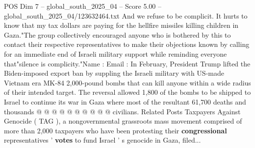 \begin{textsample}{POS Dim 7 – global\_south\_2025\_04 – Score 5.00 – global\_south\_2025\_04/123632464.txt}
And we refuse to be complicit.
It hurts to know that my tax dollars are paying for the hellfire missiles killing children in Gaza."The group collectively encouraged anyone who is bothered by this to contact their respective representatives to make their objections known by calling for an immediate end of Israeli military support while reminding everyone that"silence is complicity."Name : Email : In February, President Trump lifted the Biden-imposed export ban by suppling the Israeli military with US-made Vietnam era MK-84 2,000-pound bombs that can kill anyone within a wide radius of their intended target.
The reversal allowed 1,800 of the bombs to be shipped to Israel to continue its war in Gaza where most of the resultant 61,700 deaths and thousands @ @ @ @ @ @ @ @ @ @ civilians.
Related Posts Taxpayers Against Genocide ( TAG ), a nongovernmental grassroots mass movement comprised of more than 2,000 taxpayers who have been protesting their \textbf{congressional} representatives ' \textbf{votes} to fund Israel ' s genocide in Gaza, filed...

\end{textsample}
